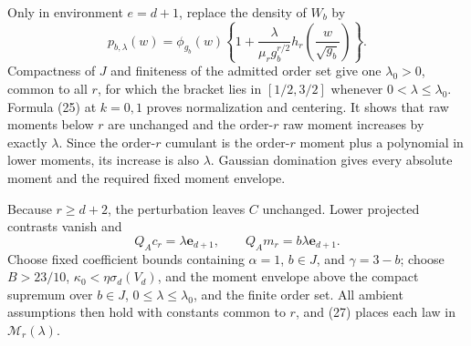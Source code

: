 Only in environment \(e=d+1\), replace the density of \(W_b\) by
\[
 p_{b,\lambda}(w)=\phi_{g_b}(w)
 \left\{1+\frac{\lambda}{\mu_rg_b^{r/2}}
 h_r\!\left(\frac w{\sqrt{g_b}}\right)\right\}.                         \tag{26}
\]
Compactness of \(J\) and finiteness of the admitted order set give one \(\lambda_0>0\), common to all \(r\), for which the bracket lies in \([1/2,3/2]\) whenever \(0<\lambda\leq\lambda_0\).  Formula (25) at \(k=0,1\) proves normalization and centering.  It shows that raw moments below \(r\) are unchanged and the order-\(r\) raw moment increases by exactly \(\lambda\).  Since the order-\(r\) cumulant is the order-\(r\) moment plus a polynomial in lower moments, its increase is also \(\lambda\).  Gaussian domination gives every absolute moment and the required fixed moment envelope.

Because \(r\geq d+2\), the perturbation leaves \(C\) unchanged.  Lower projected contrasts vanish and
\[
 Q_Ac_r=\lambda\mathbf e_{d+1},
 \qquad Q_Am_r=b\lambda\mathbf e_{d+1}.                                  \tag{27}
\]
Choose fixed coefficient bounds containing \(\alpha=1\), \(b\in J\), and \(\gamma=3-b\); choose \(B>23/10\), \(\kappa_0<\eta\sigma_d(V_d)\), and the moment envelope above the compact supremum over \(b\in J\), \(0\leq\lambda\leq\lambda_0\), and the finite order set.  All ambient assumptions then hold with constants common to \(r\), and (27) places each law in \(\mathcal M_r(\lambda)\).

